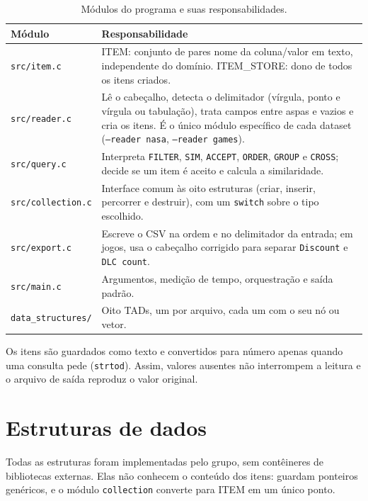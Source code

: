 \documentclass[11pt,a4paper]{article}
\newcommand{\cab}[1]{\rowcolor{gray!22}#1}
\begin{document}
\begin{table}[!htbp]
\centering
\caption{Módulos do programa e suas responsabilidades.}
\small
\begin{tabularx}{\textwidth}{@{}l Y@{}}
\toprule
\cab{\textbf{Módulo} & \textbf{Responsabilidade}} \\
\midrule
\texttt{src/\allowbreak{}item.c} & ITEM: conjunto de pares nome da coluna/valor em texto, independente do domínio. ITEM\_STORE: dono de todos os itens criados. \\
\texttt{src/\allowbreak{}reader.c} & Lê o cabeçalho, detecta o delimitador (vírgula, ponto e vírgula ou tabulação), trata campos entre aspas e vazios e cria os itens. É o único módulo específico de cada dataset (\texttt{--reader nasa}, \texttt{--reader games}). \\
\texttt{src/\allowbreak{}query.c} & Interpreta \texttt{FILTER}, \texttt{SIM}, \texttt{ACCEPT}, \texttt{ORDER}, \texttt{GROUP} e \texttt{CROSS}; decide se um item é aceito e calcula a similaridade. \\
\texttt{src/\allowbreak{}collection.c} & Interface comum às oito estruturas (criar, inserir, percorrer e destruir), com um \texttt{switch} sobre o tipo escolhido. \\
\texttt{src/\allowbreak{}export.c} & Escreve o CSV na ordem e no delimitador da entrada; em jogos, usa o cabeçalho corrigido para separar \texttt{Discount} e \texttt{DLC count}. \\
\texttt{src/\allowbreak{}main.c} & Argumentos, medição de tempo, orquestração e saída padrão. \\
\texttt{data\_\allowbreak{}structures/\allowbreak{}} & Oito TADs, um por arquivo, cada um com o seu nó ou vetor. \\
\bottomrule
\end{tabularx}
\end{table}

Os itens são guardados como texto e convertidos para número apenas quando uma consulta pede (\texttt{strtod}). Assim, valores ausentes não interrompem a leitura e o arquivo de saída reproduz o valor original.

\section{Estruturas de dados}

Todas as estruturas foram implementadas pelo grupo, sem contêineres de bibliotecas externas. Elas não conhecem o conteúdo dos itens: guardam ponteiros genéricos, e o módulo \texttt{collection} converte para ITEM em um único ponto.
\end{document}

